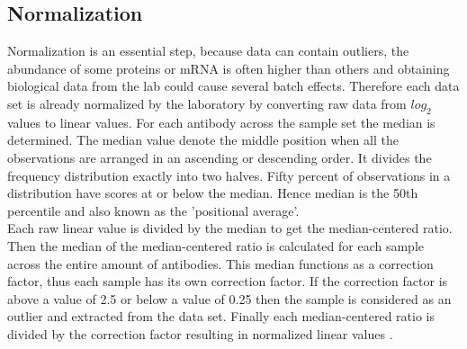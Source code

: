 \subsection*{Normalization}

Normalization is an essential step, because data can contain outliers, the abundance of some proteins or mRNA is often higher than others and obtaining biological data from the lab could cause several batch effects.
Therefore each data set is already normalized by the laboratory by converting raw data from $log_2$ values to linear values. For each antibody across the sample set the median is determined. The median value denote the middle position when all the observations are arranged in an ascending or descending order. It divides the frequency distribution exactly into two halves. Fifty percent of observations in a distribution have scores at or below the median. Hence median is the 50th percentile and also known as the 'positional average'\citep{AdamLund.2018}.
\\
Each raw linear value is divided by the median to get the median-centered ratio. Then the median of the median-centered ratio is calculated for each sample across the entire amount of antibodies. This median functions as a correction factor, thus each sample has its own correction factor. If the correction factor is above a value of 2.5 or below a value of 0.25 then the sample is considered as an outlier and extracted from the data set. Finally each median-centered ratio is divided by the correction factor resulting in normalized linear values \citep{Hill.2016} \citep{Aksoy.2001, Liu.2014}.\\
